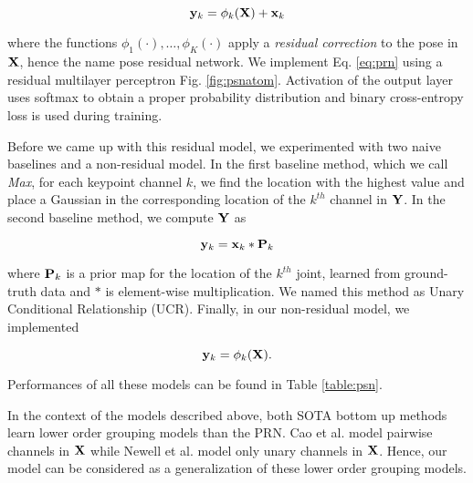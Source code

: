 \documentclass[runningheads]{llncs}
\begin{document}
\begin{equation}
{\bf y}_k = \phi_k ( {\bf X}) + {\bf x}_k 
\label{eq:prn}
\end{equation}


\noindent where the functions $\phi_1(\cdot), \dots , \phi_K(\cdot)$ apply a \textit{residual correction} to the pose in $\bf X$, hence the name pose residual network. We implement Eq. \ref{eq:prn} using a residual multilayer perceptron Fig. \ref{fig:psnatom}. Activation of the output layer uses softmax to obtain a proper probability distribution and binary cross-entropy loss is used during training. 


Before we came up with this residual model, we experimented with two naive baselines and a non-residual model. In the first baseline method, which we call \textit{Max}, for each keypoint channel $k$, we find the location with the highest value and place  a Gaussian in the corresponding location of the $k^{th}$ channel in $\bf Y$.  In the second baseline method, we compute $\bf Y$ as 


\begin{equation}
{\bf y}_k = {\bf x}_k * {\bf P}_k
\end{equation}


\noindent where ${\bf P}_k$ is a prior map for the location of the $k^{th}$ joint, learned from ground-truth data and $*$ is element-wise multiplication. We named this method as Unary Conditional Relationship (UCR). Finally, in our non-residual model, we implemented 


\begin{equation}
{\bf y}_k = \phi_k ( {\bf X}). 
\end{equation}


\noindent Performances of all these models can be found in Table   \ref{table:psn}. 


In the context of the models described above, both SOTA bottom up methods learn lower order grouping models than the PRN. Cao et al. \cite{Cao2016} model pairwise channels in ${\bf X}$ while Newell et al. \cite{Newell2016b} model only unary channels in ${\bf X}$. Hence, our model can be considered as a generalization of these lower order grouping models. 
\end{document}
